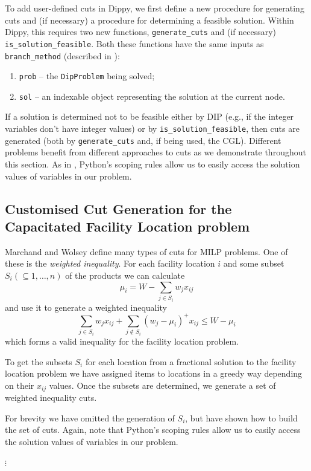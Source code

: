 To add user-defined cuts in Dippy, we first define a new procedure for generating cuts and (if necessary) a procedure for determining a feasible solution. Within Dippy, this requires two new functions, \texttt{generate\_cuts} and (if necessary) \texttt{is\_solution\_feasible}. Both these functions have the same inputs as \texttt{branch\_method} (described in ):
\begin{enumerate}
\item \texttt{prob} -- the \texttt{DipProblem} being solved;
\item \texttt{sol} -- an indexable object representing the solution at the current node.
\end{enumerate}
If a solution is determined not to be feasible either by \ac{DIP} (e.g., if the integer variables don't have integer values) or by \texttt{is\_solution\_feasible}, then cuts are generated (both by \texttt{generate\_cuts} and, if being used, the \ac{CGL}). Different problems benefit from different approaches to cuts as we demonstrate throughout this section. As in , Python's scoping rules allow us to easily access the solution values of variables in our problem.

\subsection{Customised Cut Generation for the Capacitated Facility Location problem} \label{sbs:fac_cuts}

Marchand and Wolsey \cite{agg_mir2001} define many types of cuts for \ac{MILP} problems. One of these is the \textit{weighted inequality}. For each facility location $i$ and some subset $S_i (\subseteq 1, \ldots, n)$ of the products we can calculate
\[ \mu_i = W - \sum_{j \in S_i} w_j x_{ij} \]
and use it to generate a weighted inequality
\[ \sum_{j \in S_i} w_j x_{ij} + \sum_{j \notin S_i} (w_j - \mu_i)^+ x_{ij} \leq W - \mu _i \]
which forms a valid inequality for the facility location problem.

To get the subsets $S_i$ for each location from a fractional solution to the facility location problem we have assigned items to locations in a greedy way depending on their $x_{ij}$ values. Once the subsets are determined, we generate a set of weighted inequality cuts.

For brevity we have omitted the generation of $S_i$, but have shown how to build the set of cuts. Again, note that Python's scoping rules allow us to easily access the solution values of variables in our problem.

$\vdots$


